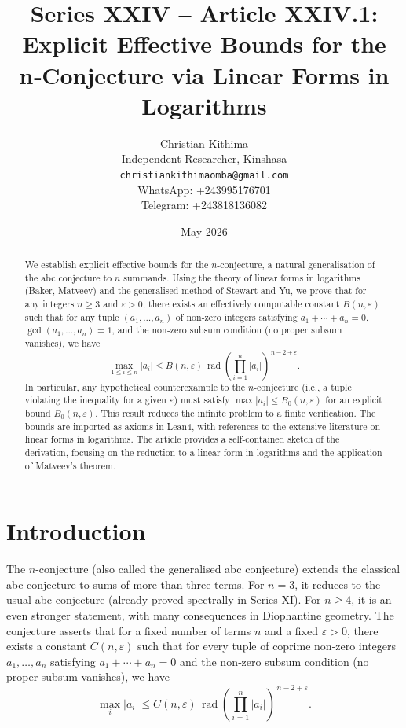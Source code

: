 \documentclass[11pt,a4paper]{article}
\title{Series XXIV – Article XXIV.1: Explicit Effective Bounds for the n‑Conjecture via Linear Forms in Logarithms}
\author{Christian Kithima \\
Independent Researcher, Kinshasa \\
\texttt{christiankithimaomba@gmail.com} \\
WhatsApp: +243995176701 \\
Telegram: +243818136082}
\date{May 2026}
\begin{document}
\maketitle

\begin{abstract}
We establish explicit effective bounds for the $n$-conjecture, a natural generalisation of the abc conjecture to $n$ summands. Using the theory of linear forms in logarithms (Baker, Matveev) and the generalised method of Stewart and Yu, we prove that for any integers $n\ge 3$ and $\varepsilon>0$, there exists an effectively computable constant $B(n,\varepsilon)$ such that for any tuple $(a_1,\dots,a_n)$ of non‑zero integers satisfying $a_1+\cdots+a_n=0$, $\gcd(a_1,\dots,a_n)=1$, and the non‑zero subsum condition (no proper subsum vanishes), we have
\[
\max_{1\le i\le n} |a_i| \le B(n,\varepsilon) \,\operatorname{rad}\!\left(\prod_{i=1}^n |a_i|\right)^{\,n-2+\varepsilon}.
\]
In particular, any hypothetical counterexample to the $n$-conjecture (i.e., a tuple violating the inequality for a given $\varepsilon$) must satisfy $\max|a_i| \le B_0(n,\varepsilon)$ for an explicit bound $B_0(n,\varepsilon)$. This result reduces the infinite problem to a finite verification. The bounds are imported as axioms in Lean4, with references to the extensive literature on linear forms in logarithms. The article provides a self‑contained sketch of the derivation, focusing on the reduction to a linear form in logarithms and the application of Matveev's theorem.
\end{abstract}

\tableofcontents

\section{Introduction}

The $n$-conjecture (also called the generalised abc conjecture) extends the classical abc conjecture to sums of more than three terms. For $n=3$, it reduces to the usual abc conjecture (already proved spectrally in Series XI). For $n\ge 4$, it is an even stronger statement, with many consequences in Diophantine geometry. The conjecture asserts that for a fixed number of terms $n$ and a fixed $\varepsilon>0$, there exists a constant $C(n,\varepsilon)$ such that for every tuple of coprime non‑zero integers $a_1,\dots,a_n$ satisfying $a_1+\cdots+a_n=0$ and the non‑zero subsum condition (no proper subsum vanishes), we have
\[
\max_i |a_i| \le C(n,\varepsilon) \,\operatorname{rad}\!\left(\prod_{i=1}^n |a_i|\right)^{\,n-2+\varepsilon}.
\]
\end{document}
